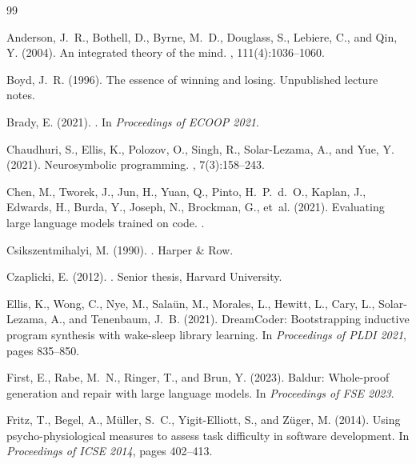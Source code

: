\documentclass[11pt,a4paper]{article}
\begin{document}
\begin{thebibliography}{99}

Anderson, J.~R., Bothell, D., Byrne, M.~D., Douglass, S.,
Lebiere, C., and Qin, Y. (2004).
\newblock An integrated theory of the mind.
, 111(4):1036--1060.

Boyd, J.~R. (1996).
\newblock The essence of winning and losing.
\newblock Unpublished lecture notes.

Brady, E. (2021).
.
\newblock In {\em Proceedings of ECOOP 2021}.

Chaudhuri, S., Ellis, K., Polozov, O., Singh, R., Solar-Lezama, A.,
and Yue, Y. (2021).
\newblock Neurosymbolic programming.
,
7(3):158--243.

Chen, M., Tworek, J., Jun, H., Yuan, Q., Pinto, H.~P.~d.~O.,
Kaplan, J., Edwards, H., Burda, Y., Joseph, N., Brockman, G.,
et~al. (2021).
\newblock Evaluating large language models trained on code.
.

Csikszentmihalyi, M. (1990).
.
\newblock Harper \& Row.

Czaplicki, E. (2012).
.
\newblock Senior thesis, Harvard University.

Ellis, K., Wong, C., Nye, M., Sala{\"u}n, M., Morales, L.,
Hewitt, L., Cary, L., Solar-Lezama, A., and Tenenbaum, J.~B. (2021).
\newblock DreamCoder: Bootstrapping inductive program synthesis with
wake-sleep library learning.
\newblock In {\em Proceedings of PLDI 2021}, pages 835--850.

First, E., Rabe, M.~N., Ringer, T., and Brun, Y. (2023).
\newblock Baldur: Whole-proof generation and repair with large language
models.
\newblock In {\em Proceedings of FSE 2023}.

Fritz, T., Begel, A., M{\"u}ller, S.~C., Yigit-Elliott, S., and
Z{\"u}ger, M. (2014).
\newblock Using psycho-physiological measures to assess task difficulty
in software development.
\newblock In {\em Proceedings of ICSE 2014}, pages 402--413.


\end{thebibliography}
\end{document}
